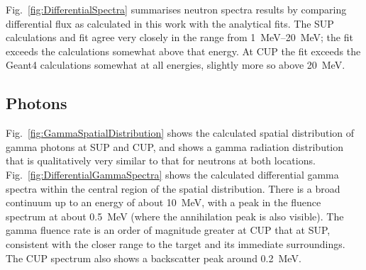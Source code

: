 \documentclass[peerreviewca,11pt,a4paper]{IEEEtran}
\begin{document}
Fig.~\ref{fig:DifferentialSpectra} summarises neutron spectra results by comparing differential flux as calculated in this work with the analytical fits.
The SUP calculations and fit agree very closely in the range from \SIrange{1}{20}{\MeV}; the fit exceeds the calculations somewhat above that energy.
At CUP the fit exceeds the Geant4 calculations somewhat at all energies, slightly more so above \SI{20}{\MeV}.

\subsection{Photons}
Fig.~\ref{fig:GammaSpatialDistribution} shows the calculated spatial distribution of gamma photons at SUP and CUP, and shows a gamma radiation distribution that is qualitatively very similar to that for neutrons at both locations.
Fig.~\ref{fig:DifferentialGammaSpectra} shows the calculated differential gamma spectra within the central region of the spatial distribution.
There is a broad continuum up to an energy of about \SI{10}{\MeV}, with a peak in the fluence spectrum at about \SI{0.5}{\MeV} (where the annihilation peak is also visible).
The gamma fluence rate is an order of magnitude greater at CUP that at SUP, consistent with the closer range to the target and its immediate surroundings.
The CUP spectrum also shows a backscatter peak around \SI{0.2}{\MeV}.
\end{document}
